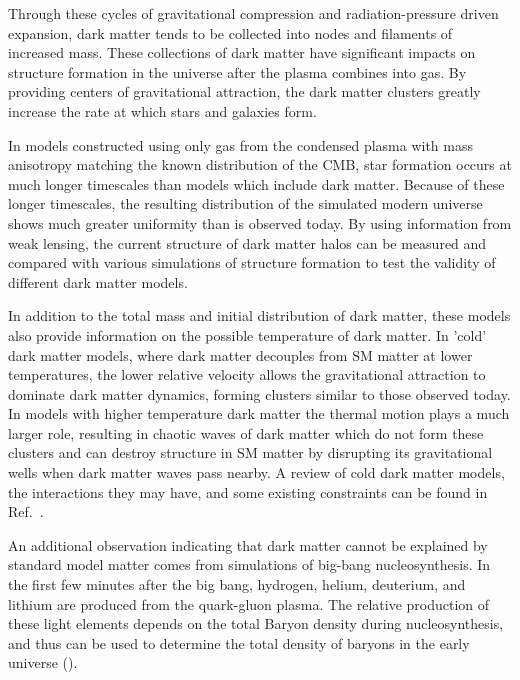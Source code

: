 Through these cycles of gravitational compression and radiation-pressure driven expansion, dark matter tends to be collected into nodes and filaments of increased mass. 
These collections of dark matter have significant impacts on structure formation in the universe after the plasma combines into gas.
By providing centers of gravitational attraction, the dark matter clusters greatly increase the rate at which stars and galaxies form.

In models constructed using only gas from the condensed plasma with mass anisotropy matching the known distribution of the CMB, star formation occurs at much longer timescales than models which include dark matter.
Because of these longer timescales, the resulting distribution of the simulated modern universe shows much greater uniformity than is observed today. 
By using information from weak lensing, the current structure of dark matter halos can be measured and compared with various simulations of structure formation to test the validity of different dark matter models.

In addition to the total mass and initial distribution of dark matter, these models also provide information on the possible temperature of dark matter.
In 'cold' dark matter models, where dark matter decouples from SM matter at lower temperatures, the lower relative velocity allows the gravitational attraction to dominate dark matter dynamics, forming clusters similar to those observed today.
In models with higher temperature dark matter the thermal motion plays a much larger role, resulting in chaotic waves of dark matter which do not form these clusters and can destroy structure in SM matter by disrupting its gravitational wells when dark matter waves pass nearby.
A review of cold dark matter models, the interactions they may have, and some existing constraints can be found in Ref.~\cite{sym_CDMreview}.

An additional observation indicating that dark matter cannot be explained by standard model matter comes from simulations of big-bang nucleosynthesis. 
In the first few minutes after the big bang, hydrogen, helium, deuterium, and lithium are produced from the quark-gluon plasma. 
The relative production of these light elements depends on the total Baryon density during nucleosynthesis, and thus can be used to determine the total density of baryons in the early universe ().

